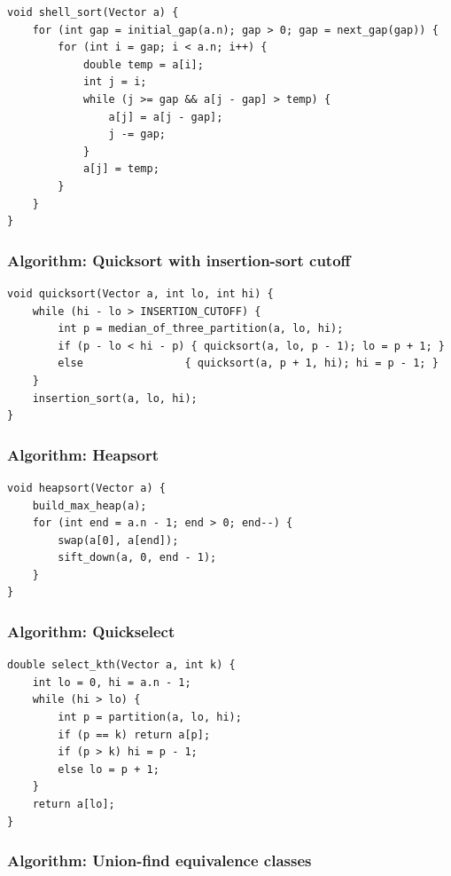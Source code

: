 \documentclass[11pt]{article}
\begin{document}
\begin{verbatim}
void shell_sort(Vector a) {
    for (int gap = initial_gap(a.n); gap > 0; gap = next_gap(gap)) {
        for (int i = gap; i < a.n; i++) {
            double temp = a[i];
            int j = i;
            while (j >= gap && a[j - gap] > temp) {
                a[j] = a[j - gap];
                j -= gap;
            }
            a[j] = temp;
        }
    }
}
\end{verbatim}

\subsubsection{Algorithm: Quicksort with insertion-sort cutoff}\label{algorithm-quicksort-with-insertion-sort-cutoff}

\begin{verbatim}
void quicksort(Vector a, int lo, int hi) {
    while (hi - lo > INSERTION_CUTOFF) {
        int p = median_of_three_partition(a, lo, hi);
        if (p - lo < hi - p) { quicksort(a, lo, p - 1); lo = p + 1; }
        else                { quicksort(a, p + 1, hi); hi = p - 1; }
    }
    insertion_sort(a, lo, hi);
}
\end{verbatim}

\subsubsection{Algorithm: Heapsort}\label{algorithm-heapsort}

\begin{verbatim}
void heapsort(Vector a) {
    build_max_heap(a);
    for (int end = a.n - 1; end > 0; end--) {
        swap(a[0], a[end]);
        sift_down(a, 0, end - 1);
    }
}
\end{verbatim}

\subsubsection{Algorithm: Quickselect}\label{algorithm-quickselect}

\begin{verbatim}
double select_kth(Vector a, int k) {
    int lo = 0, hi = a.n - 1;
    while (hi > lo) {
        int p = partition(a, lo, hi);
        if (p == k) return a[p];
        if (p > k) hi = p - 1;
        else lo = p + 1;
    }
    return a[lo];
}
\end{verbatim}

\subsubsection{Algorithm: Union-find equivalence classes}\label{algorithm-union-find-equivalence-classes}
\end{document}
